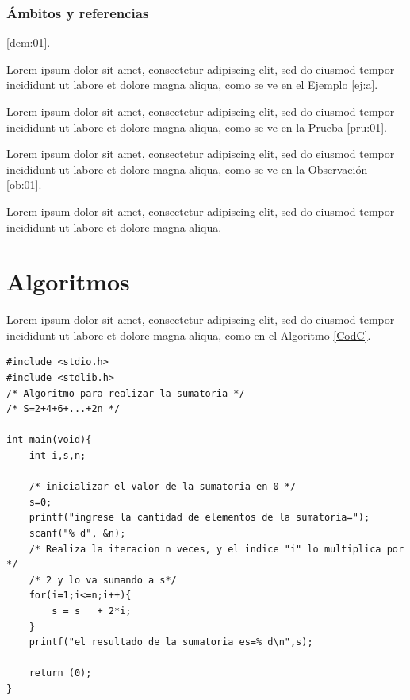 \subsubsection{Ámbitos y referencias}

    \blindtext %
\ref{dem:01}.
\begin{demo}\label{dem:01}
\blindtext %
\end{demo}

    Lorem ipsum dolor sit amet, consectetur adipiscing elit, sed do eiusmod tempor incididunt ut labore et dolore magna aliqua, como se ve en el Ejemplo \ref{ej:a}.

\begin{ejemplo}\label{ej:a}
    \blindtext %

\end{ejemplo}

    Lorem ipsum dolor sit amet, consectetur adipiscing elit, sed do eiusmod tempor incididunt ut labore et dolore magna aliqua, como se ve en la Prueba \ref{pru:01}.
\begin{prueba}\label{pru:01}
   \blindtext %

\end{prueba}


    Lorem ipsum dolor sit amet, consectetur adipiscing elit, sed do eiusmod tempor incididunt ut labore et dolore magna aliqua, como se ve en la Observación \ref{ob:01}.
\begin{obs}\label{ob:01}
    Lorem ipsum dolor sit amet, consectetur adipiscing elit, sed do eiusmod tempor incididunt ut labore et dolore magna aliqua.
\end{obs}


\section{Algoritmos}\label{A:alg}
\blindtext %

Lorem ipsum dolor sit amet, consectetur adipiscing elit, sed do eiusmod tempor incididunt ut labore et dolore magna aliqua, como en el Algoritmo \ref{CodC}.

\lstset{language=C}
\begin{lstlisting}[caption = C\'odigo en C de una sumatoria, label = CodC]
#include <stdio.h>
#include <stdlib.h>
/* Algoritmo para realizar la sumatoria */
/* S=2+4+6+...+2n */

int main(void){
	int i,s,n;
	
	/* inicializar el valor de la sumatoria en 0 */
	s=0;
	printf("ingrese la cantidad de elementos de la sumatoria=");
	scanf("% d", &n);
	/* Realiza la iteracion n veces, y el indice "i" lo multiplica por */
	/* 2 y lo va sumando a s*/
	for(i=1;i<=n;i++){
		s = s	+ 2*i;
	} 
	printf("el resultado de la sumatoria es=% d\n",s);

	return (0);
}
\end{lstlisting}



